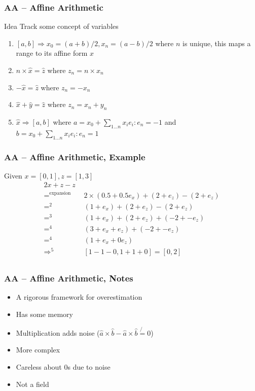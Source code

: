 \documentclass{beamer}
\begin{document}
\begin{frame}
\frametitle{AA -- Affine Arithmetic}

\begin{block}{Idea}
Track some concept of variables
\end{block}

\begin{enumerate}
  \item $[a, b] \Rightarrow x_0 = (a + b) / 2, x_n = (a - b) / 2$ where $n$ is unique, this maps a range to its affine form $\hat{x}$
  \item $n \times \hat{x} = \hat{z}$ where $z_n = n \times x_n$
  \item $-\hat{x} = \hat{z}$ where $z_n = -x_n$
  \item $\hat{x} + \hat{y} = \hat{z}$ where $z_n = x_n + y_n$
  \item $\hat{x} \Rightarrow [a, b]$ where $a = x_0 + \sum_{1\dots{}n}{x_ie_i}: e_n = -1$ and $b = x_0 + \sum_{1\dots{}n}{x_ie_i}: e_n = 1$
\end{enumerate}
\end{frame}

\begin{frame}
\frametitle{AA -- Affine Arithmetic, Example}

Given $x = [0, 1], z = [1, 3]$
\begin{align*}
    2x + z - z \\
    =^{\text{expansion}} \quad & 2 \times (0.5 + 0.5e_x) + (2 + e_z) - (2 + e_z) \\
    =^{2} \quad & (1 + e_x) + (2 + e_z) - (2 + e_z) \\
    =^{3} \quad & (1 + e_x) + (2 + e_z) + (-2 + -e_z) \\
    =^{4} \quad & (3 + e_x + e_z) + (-2 + -e_z) \\
    =^{4} \quad & (1 + e_x + 0e_z) \\
    \Rightarrow^{5} \quad & [1 - 1 - 0, 1 + 1 + 0] = [0, 2]\\
\end{align*}
\end{frame}

\begin{frame}
\frametitle{AA -- Affine Arithmetic, Notes}

\begin{itemize}
  \item A rigorous framework for overestimation
  \item Has some memory
  \item Multiplication adds noise ($\hat{a}\times\hat{b} - \hat{a}\times\hat{b} \not{=} 0$)
  \item More complex
  \item Careless about 0s due to noise
  \item Not a field
\end{itemize}
\end{frame}
\end{document}
